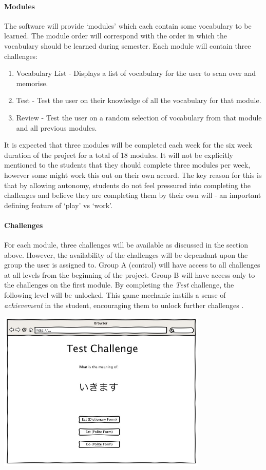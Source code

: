 \paragraph{Modules}
The software will provide `modules' which each contain some vocabulary to be learned.
The module order will correspond with the order in which the vocabulary should
be learned during semester. Each module will contain three challenges:
\begin{enumerate}
	\item Vocabulary List - Displays a list of vocabulary for the user to scan
		over and memorise.
	\item Test - Test the user on their knowledge of all the vocabulary for
		that module.
	\item Review - Test the user on a random selection of vocabulary from that
		module and all previous modules.
\end{enumerate}

It is expected that three modules will be completed each week for the six week
duration of the project for a total of 18 modules. It will not be explicitly
mentioned to the students that they should complete three modules per week,
however some might work this out on their own accord.
The key reason for this is that by allowing autonomy, students do not feel 
pressured into completing the challenges and believe they are completing them 
by their own will - an important defining feature of `play' vs `work'\cite{sebastian_deterding_meaningful_2011}.

\paragraph{Challenges}
For each module, three challenges will be available as discussed in the section
above. However, the availability of the challenges will be dependant upon the
group the user is assigned to. Group A (control) will have access to all
challenges at all levels from the beginning of the project. Group B will have
access only to the challenges on the first module. By completing the \textit{Test}
challenge, the following level will be unlocked. This game mechanic instills
a sense of \textit{achievement} in the student, encouraging them to unlock further
challenges \cite{gabe_zichermann_fun_2010}.

\includegraphics[width=10cm]{./screens/challenge.jpg}\\

